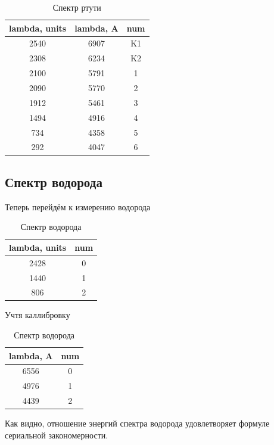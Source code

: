 \documentclass{article}
\begin{document}
\begin{table}[H]
	\centering
\begin{tabular}{|c|c|c|}
	\hline
lambda, units & lambda, A & num \\\hline
2540          & 6907      & K1  \\\hline
2308          & 6234      & K2  \\\hline
2100          & 5791      & 1   \\\hline
2090          & 5770      & 2   \\\hline
1912          & 5461      & 3   \\\hline
1494          & 4916      & 4   \\\hline
734           & 4358      & 5   \\\hline
292           & 4047      & 6   \\\hline
\end{tabular}
	\caption{Спектр ртути}
\end{table}
\subsection{Спектр водорода}
Теперь перейдём к измерению водорода

\begin{table}[H]
	\centering
\begin{tabular}{|c|c|}
	\hline
lambda, units & num \\\hline
2428          & 0   \\\hline
1440          & 1   \\\hline
806           & 2   \\\hline
\end{tabular}
	\caption{Спектр водорода}
\end{table}

Учтя каллибровку

\begin{table}[H]
	\centering
\begin{tabular}{|c|c|}
	\hline
lambda, A & num \\\hline
6556 & 0 \\\hline
4976 & 1 \\\hline
4439 & 2 \\\hline
\end{tabular}
	\caption{Спектр водорода}
\end{table}

Как видно, отношение энергий спектра водорода удовлетворяет формуле  сериальной
закономерности.
\end{document}
